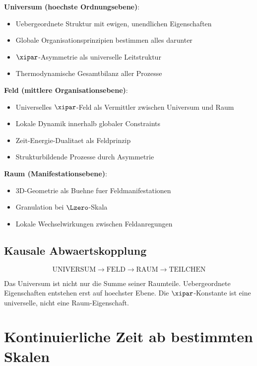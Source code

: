 	\textbf{Universum (hoechste Ordnungsebene)}:
	\begin{itemize}
		\item Uebergeordnete Struktur mit ewigen, unendlichen Eigenschaften
		\item Globale Organisationsprinzipien bestimmen alles darunter
		\item $\xipar$-Asymmetrie als universelle Leitstruktur
		\item Thermodynamische Gesamtbilanz aller Prozesse
	\end{itemize}
	
	\textbf{Feld (mittlere Organisationsebene)}:
	\begin{itemize}
		\item Universelles $\xipar$-Feld als Vermittler zwischen Universum und Raum
		\item Lokale Dynamik innerhalb globaler Constraints
		\item Zeit-Energie-Dualitaet als Feldprinzip
		\item Strukturbildende Prozesse durch Asymmetrie
	\end{itemize}
	
	\textbf{Raum (Manifestationsebene)}:
	\begin{itemize}
		\item 3D-Geometrie als Buehne fuer Feldmanifestationen
		\item Granulation bei $\Lzero$-Skala
		\item Lokale Wechselwirkungen zwischen Feldanregungen
	\end{itemize}
	
	\subsection{Kausale Abwaertskopplung}
	
	\begin{equation}
		\text{UNIVERSUM} \rightarrow \text{FELD} \rightarrow \text{RAUM} \rightarrow \text{TEILCHEN}
	\end{equation}
	
	Das Universum ist nicht nur die Summe seiner Raumteile. Uebergeordnete Eigenschaften entstehen erst auf hoechster Ebene. Die $\xipar$-Konstante ist eine universelle, nicht eine Raum-Eigenschaft.
	
	\section{Kontinuierliche Zeit ab bestimmten Skalen}
	
